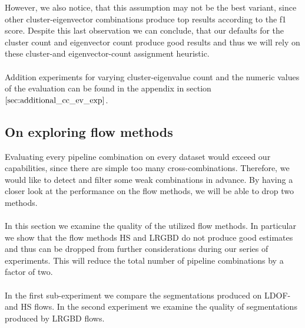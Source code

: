 However, we also notice, that this assumption may not be the best variant, since other cluster-eigenvector combinations produce top results according to the f1 score. Despite this last observation we can conclude, that our defaults for the cluster count and eigenvector count produce good results and thus we will rely on these cluster-and eigenvector-count assignment heuristic. \\ \\
Addition experiments for varying cluster-eigenvalue count and the numeric values of the evaluation can be found in the appendix in section $\ref{sec:additional_cc_ev_exp}$.


\subsection{On exploring flow methods}
\label{sec:flow_methods}
Evaluating every pipeline combination on every dataset would exceed our capabilities, since there are simple too many cross-combinations. Therefore, we would like to detect and filter some weak combinations in advance. By having a closer look at the performance on the flow methods, we will be able to drop two methods. \\ \\
In this section we examine the quality of the utilized flow methods. In particular we show that the flow methods HS and LRGBD do not produce good estimates and thus can be dropped from further considerations during our series of experiments. This will reduce the total number of pipeline combinations by a factor of two. \\ \\
In the first sub-experiment we compare the segmentations produced on LDOF-and HS flows. In the second experiment we examine the quality of segmentations produced by LRGBD flows.

